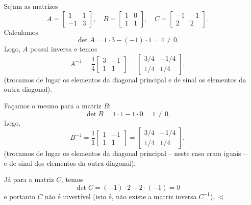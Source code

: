 \documentclass[../livro.tex]{subfiles}  %
\begin{document}
\begin{example}\label{exp:2x2}
	Sejam as matrizes
	\begin{equation}
	A = \left[
	\begin{array}{cc}
	1 & 1  \\
	-1 & 3 
	\end{array}
	\right], \quad
	B = \left[
	\begin{array}{cc}
	1 & 0  \\
	1 & 1 
	\end{array}
	\right], \quad
	C = \left[
	\begin{array}{cc}
	-1 & -1  \\
	2 & 2 
	\end{array}
	\right].
	\end{equation} Calculamos
	\begin{equation}
	\det A = 1\cdot 3 - (-1)\cdot 1 = 4 \neq 0.
	\end{equation}
	Logo, $A$ possui inversa e temos
	\begin{equation}
	A^{-1} = \frac{1}{4}
	\left[
	\begin{array}{cc}
	3 & -1  \\
	1 & 1 
	\end{array}
	\right] =
	\left[
	\begin{array}{cc}
	3/4 & -1/4  \\
	1/4 & 1/4 
	\end{array}
	\right].
	\end{equation}(trocamos de lugar os elementos da diagonal principal e de sinal os elementos da outra diagonal).
	
	Façamos o mesmo para a matriz $B$:
	\begin{equation}
	\det B = 1\cdot 1 - 1 \cdot 0 = 1 \neq 0.
	\end{equation} Logo,
	\begin{equation}
	B^{-1} = \frac{1}{1}
	\left[
	\begin{array}{cc}
	1 & -1  \\
	1 & 1 
	\end{array}
	\right] =
	\left[
	\begin{array}{cc}
	3/4 & -1/4  \\
	1/4 & 1/4 
	\end{array}
	\right].
	\end{equation}(trocamos de lugar os elementos da diagonal principal -- neste caso eram iguais -- e de sinal dos elementos da outra diagonal).
	
	Já para a matriz $C$, temos
	\begin{equation}
	\det C = (-1) \cdot 2 - 2 \cdot (-1) = 0
	\end{equation} e portanto $C$ não é invertível (isto é, não existe a matriz inversa $C^{-1}$)$. \ \lhd$
\end{example}
\end{document}
